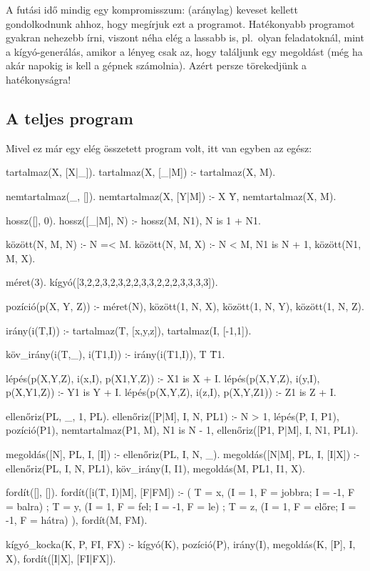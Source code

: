 A futási idő mindig egy kompromisszum: (aránylag)
keveset kellett gondolkodnunk ahhoz, hogy megírjuk
ezt a programot. Hatékonyabb programot gyakran
nehezebb írni, viszont néha elég a lassabb is,
pl.~olyan feladatoknál, mint a kígyó-generálás,
amikor a lényeg csak az, hogy találjunk egy
megoldást (még ha akár napokig is kell a gépnek
számolnia). Azért persze törekedjünk a
hatékonyságra!

\subsection*{A teljes program}

Mivel ez már egy elég összetett program volt, itt
van egyben az egész:

\begin{program}
tartalmaz(X, [X|_]).
tartalmaz(X, [_|M]) :- tartalmaz(X, M).

nemtartalmaz(_, []).
nemtartalmaz(X, [Y|M]) :- X \= Y, nemtartalmaz(X, M).

hossz([], 0).
hossz([_|M], N) :- hossz(M, N1), N is 1 + N1.

között(N, M, N) :- N =< M.
között(N, M, X) :-
    N < M, N1 is N + 1,
    között(N1, M, X).

méret(3).
kígyó([3,2,2,3,2,3,2,2,3,3,2,2,2,3,3,3,3]).




pozíció(p(X, Y, Z)) :-
    méret(N), között(1, N, X),
    között(1, N, Y), között(1, N, Z).

irány(i(T,I)) :-
    tartalmaz(T, [x,y,z]),
    tartalmaz(I, [-1,1]).

köv_irány(i(T,_), i(T1,I)) :-
    irány(i(T1,I)), T \= T1.

lépés(p(X,Y,Z), i(x,I), p(X1,Y,Z)) :- X1 is X + I.
lépés(p(X,Y,Z), i(y,I), p(X,Y1,Z)) :- Y1 is Y + I.
lépés(p(X,Y,Z), i(z,I), p(X,Y,Z1)) :- Z1 is Z + I.

ellenőriz(PL, _, 1, PL).
ellenőriz([P|M], I, N, PL1) :-
    N > 1, lépés(P, I, P1),
    pozíció(P1), nemtartalmaz(P1, M), N1 is N - 1,
    ellenőriz([P1, P|M], I, N1, PL1).

megoldás([N], PL, I, [I]) :- ellenőriz(PL, I, N, _).
megoldás([N|M], PL, I, [I|X]) :-
    ellenőriz(PL, I, N, PL1), köv_irány(I, I1), 
    megoldás(M, PL1, I1, X).

fordít([], []).
fordít([i(T, I)|M], [F|FM]) :-
    (  T = x, (I = 1, F = jobbra; I = -1, F = balra)
     ; T = y, (I = 1, F = fel;    I = -1, F = le)
     ; T = z, (I = 1, F = előre;  I = -1, F = hátra)
    ), 
    fordít(M, FM).

kígyó_kocka(K, P, FI, FX) :-
    kígyó(K), pozíció(P), irány(I),
    megoldás(K, [P], I, X), fordít([I|X], [FI|FX]).
\end{program}
